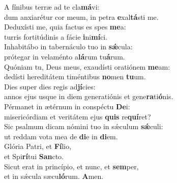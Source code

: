 \evenverse A fínibus terræ ad te cla\textbf{má}vi:~\*\\
\evenverse dum anxiarétur cor meum, in petra \textbf{e}xal\textbf{tá}sti me.\\
\oddverse Deduxísti me, quia factus es spes \textbf{me}a:~\*\\
\oddverse turris fortitúdinis a fácie \textbf{i}ni\textbf{mí}ci.\\
\evenverse Inhabitábo in tabernáculo tuo in \textbf{sǽ}cula:~\*\\
\evenverse prótegar in velaménto a\textbf{lá}rum tu\textbf{á}rum.\\
\oddverse Quóniam tu, Deus meus, exaudísti oratiónem \textbf{me}am:~\*\\
\oddverse dedísti hereditátem timéntibus \textbf{no}men \textbf{tu}um.\\
\evenverse Dies super dies regis ad\textbf{jí}cies:~\*\\
\evenverse annos ejus usque in diem generatiónis et gene\textbf{ra}ti\textbf{ó}nis.\\
\oddverse Pérmanet in ætérnum in conspéctu \textbf{De}i:~\*\\
\oddverse misericórdiam et veritátem ejus \textbf{quis} re\textbf{quí}ret?\\
\evenverse Sic psalmum dicam nómini tuo in sǽculum \textbf{sǽ}culi:~\*\\
\evenverse ut reddam vota mea de \textbf{di}e in \textbf{di}em.\\
\oddverse Glória Patri, et \textbf{Fí}lio,~\*\\
\oddverse et Spi\textbf{rí}tui \textbf{San}cto.\\
\evenverse Sicut erat in princípio, et nunc, et \textbf{sem}per,~\*\\
\evenverse et in sǽcula sæcu\textbf{ló}rum. \textbf{A}men.\\
